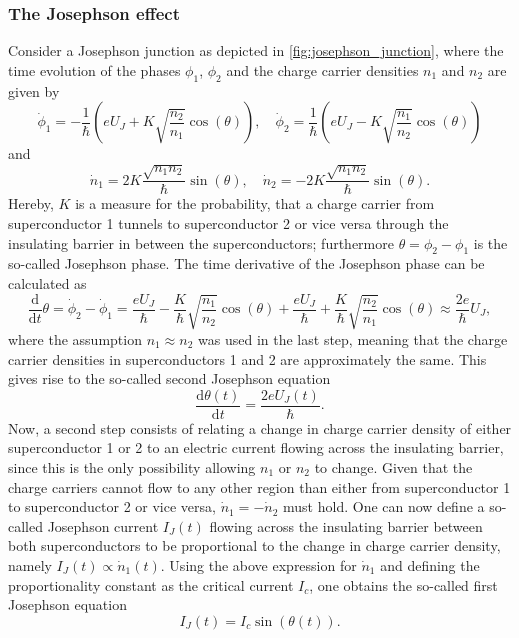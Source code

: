 \documentclass{report}
\numberwithin{tm}{section}
\begin{document}
\subsubsection{The Josephson effect}
Consider a Josephson junction as depicted in \cref{fig:josephson_junction}, where the time evolution of the phases $\phi_1$, $\phi_2$ and the charge carrier densities $n_1$ and $n_2$ are given by \begin{equation}
	\dot{\phi}_1 = -\frac{1}{\hbar}\left(eU_J + K\sqrt{\frac{n_2}{n_1}}\cos(\theta)\right), \quad  \dot{\phi}_2 = \frac{1}{\hbar}\left(eU_J-K\sqrt{\frac{n_1}{n_2}}\cos(\theta)\right)
\end{equation} and \begin{equation}
\dot{n}_1 = 2K\frac{\sqrt{n_1n_2}}{\hbar}\sin(\theta), \quad \dot{n}_2 = -2K\frac{\sqrt{n_1n_2}}{\hbar}\sin(\theta).
\end{equation} Hereby, $K$ is a measure for the probability, that a charge carrier from superconductor 1 tunnels to superconductor 2 or vice versa through the insulating barrier in between the superconductors; furthermore $\theta = \phi_2-\phi_1$ is the so-called Josephson phase. The time derivative of the Josephson phase can be calculated as \begin{equation}
\frac{\mathrm{d}}{\mathrm{d}t}\theta = \dot{\phi}_2 - \dot{\phi}_1 = \frac{eU_J}{\hbar} - \frac{K}{\hbar}\sqrt{\frac{n_1}{n_2}}\cos(\theta) + \frac{eU_J}{\hbar} + \frac{K}{\hbar}\sqrt{\frac{n_2}{n_1}}\cos(\theta)\approx  \frac{2e}{\hbar}U_J,
\end{equation} where the assumption $n_1 \approx n_2$ was used in the last step, meaning that the charge carrier densities in superconductors 1 and 2 are approximately the same. This gives rise to the so-called second Josephson equation \begin{equation}\label{eq:2nd_josephson_equation}
\frac{\mathrm{d}\theta(t)}{\mathrm{d}t} = \frac{2eU_J(t)}{\hbar}.
\end{equation} Now, a second step consists of relating a change in charge carrier density of either superconductor 1 or 2 to an electric current flowing across the insulating barrier, since this is the only possibility allowing $n_1$ or $n_2$ to change. Given that the charge carriers cannot flow to any other region than either from superconductor 1 to superconductor 2 or vice versa, $\dot{n}_1 = -\dot{n}_2$ must hold. One can now define a so-called Josephson current $I_J(t)$ flowing across the insulating barrier between both superconductors to be proportional to the change in charge carrier density, namely $I_J(t) \propto \dot{n}_1(t)$. Using the above expression for $\dot{n}_1$ and defining the proportionality constant as the critical current $I_c$, one obtains the so-called first Josephson equation \begin{equation}\label{eq:1st_josephson_equation}
I_J(t) = I_c\sin(\theta(t)).
\end{equation}
\end{document}

